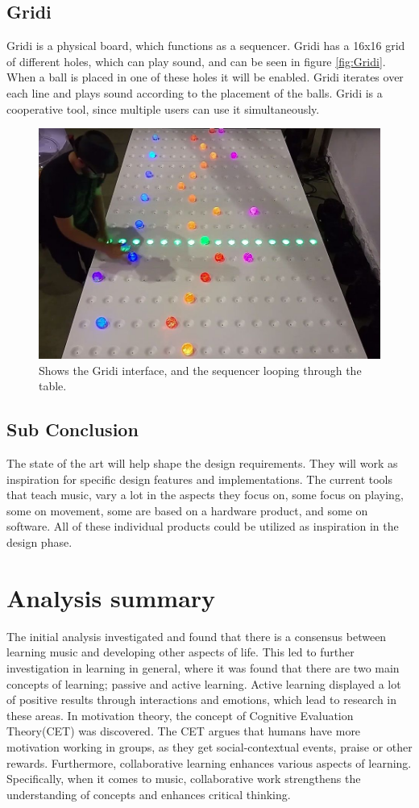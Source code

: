 \subsection{Gridi}
Gridi is a physical board, which functions as a sequencer. Gridi has a 16x16 grid of different holes, which can play sound, and can be seen in figure \autoref{fig:Gridi}. When a ball is placed in one of these holes it will be enabled. Gridi iterates over each line and plays sound according to the placement of the balls. Gridi is a cooperative tool, since multiple users can use it simultaneously.

\begin{figure}[H]
	\centering
	\includegraphics[width=0.7\linewidth]{figure/Analysis/gridi}
	\caption{Shows the Gridi interface, and the sequencer looping through the table.}
	\label{fig:Gridi}
\end{figure}

\subsection*{Sub Conclusion}
The state of the art will help shape the design requirements. They will work as inspiration for specific design features and implementations. The current tools that teach music, vary a lot in the aspects they focus on, some focus on playing, some on movement, some are based on a hardware product, and some on software. All of these individual products could be utilized as inspiration in the design phase.

\section{Analysis summary}
The initial analysis investigated and found that there is a consensus between learning music and developing other aspects of life. This led to further investigation in learning in general, where it was found that there are two main concepts of learning; passive and active learning. Active learning displayed a lot of positive results through interactions and emotions, which lead to research in these areas. In motivation theory, the concept of Cognitive Evaluation Theory(CET) was discovered. The CET argues that humans have more motivation working in groups, as they get social-contextual events, praise or other rewards. Furthermore, collaborative learning enhances various aspects of learning. Specifically, when it comes to music, collaborative work strengthens the understanding of concepts and enhances critical thinking.\\

